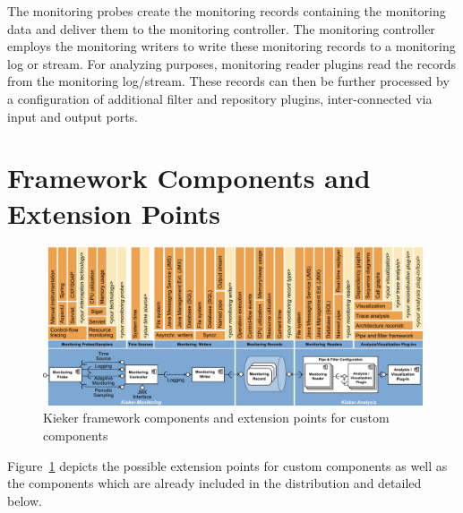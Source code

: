 
\noindent The monitoring probes create the monitoring records containing the %
monitoring data and deliver them to the monitoring controller. %
The monitoring controller employs the monitoring writers to write these %
monitoring records to a monitoring log or stream. %
For analyzing purposes, monitoring reader plugins read the records from the %
monitoring log/stream. These records can then be further processed by a %
configuration of additional filter and repository plugins, inter-connected via input and output ports. %

\section{Framework Components and Extension Points}

\begin{figure}\centering
\includegraphics[width=\textwidth]{images/framework-figure}
\caption{Kieker framework components and extension points for custom components}
\label{fig:frameworkComponentsExtensionPoints}
\end{figure}

Figure~\ref{fig:frameworkComponentsExtensionPoints} depicts the possible %
extension points for custom components as well as the components which %
are already included in the \Kieker{} distribution and detailed below. %

\medskip

